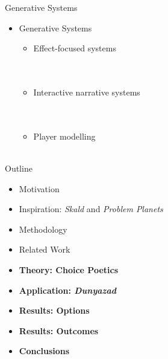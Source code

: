\documentclass[xcolor=x11names]{beamer}
\def\dunyazad/{\textit{Dunyazad}}
\def\skald/{\textit{Skald}}
\def\problemplanets/{\textit{Problem Planets}}
\begin{document}
\begin{frame}{Generative Systems}
  \begin{itemize}\addtolength{\itemsep}{0.5\baselineskip}
    \item Generative Systems
    \begin{itemize}\addtolength{\itemsep}{0.5\baselineskip}
      \vspace{0.5\baselineskip}
      \item Effect-focused systems \\ \vspace{0.3\baselineskip}
        \tiny
         \\
         \\

      \item \small Interactive narrative systems \\ \vspace{0.3\baselineskip}
        \tiny
         \\
         \\

      \item \small Player modelling \\ \vspace{0.3\baselineskip}
        \tiny
         \\
    \end{itemize}
  \end{itemize}
\end{frame}



\begin{frame}{Outline}
  \begin{itemize}
    \item Motivation
    \item Inspiration: \skald/ and \problemplanets/
    \item Methodology
    \item Related Work
    \item \textbf{Theory: Choice Poetics}
    \item \textbf{Application: \dunyazad/}
    \item \textbf{Results: Options}
    \item \textbf{Results: Outcomes}
    \item \textbf{Conclusions}
  \end{itemize}
\end{frame}
\end{document}
